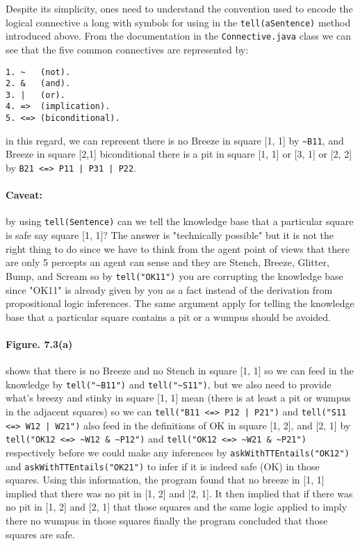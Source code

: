 \documentclass[a4paper]{report}
\begin{document}
Despite its simplicity, ones need to understand the convention used to encode the logical connective a long with symbols for using in the \texttt{tell(aSentence)} method introduced above. From the documentation in the \texttt{Connective.java} class we can see that the five common connectives are represented by: 

\begin{verbatim}
1. ~   (not).
2. &   (and).
3. |   (or).
4. =>  (implication).
5. <=> (biconditional).
\end{verbatim}

\noindent in this regard, we can represent there is no Breeze in square [1, 1] by \texttt{\textasciitilde{}B11}, and Breeze in square [2,1] biconditional there is a pit in square [1, 1] or [3, 1] or [2, 2] by \texttt{B21 <=> P11 | P31 | P22}.

\paragraph{Caveat: } by using \texttt{tell(Sentence)} can we tell the knowledge base that a particular square is safe say square [1, 1]? The answer is "technically possible" but it is not the right thing to do since we have to think from the agent point of views that there are only 5 percepts an agent can sense and they are Stench, Breeze, Glitter, Bump, and Scream so by \texttt{tell("OK11")} you are corrupting the knowledge base since "OK11" is already given by you as a fact instead of the derivation from propositional logic inferences. The same argument apply for telling the knowledge base that a particular square contains a pit or a wumpus should be avoided.\\

\paragraph{Figure. 7.3(a) } shows that there is no Breeze and no Stench in square [1, 1] so we can feed in the knowledge by \texttt{tell("\textasciitilde{}B11")} and \texttt{tell("\textasciitilde{}S11")}, but we also need to provide what's breezy and stinky in square [1, 1] mean (there is at least a pit or wumpus in the adjacent squares) so we can \texttt{tell("B11 <=> P12 | P21")} and \texttt{tell("S11 <=> W12 | W21")} also feed in the definitions of OK in square [1, 2], and [2, 1] by \texttt{tell("OK12 <=> \textasciitilde{}W12 \& \textasciitilde{}P12")} and \texttt{tell("OK12 <=> \textasciitilde{}W21 \& \textasciitilde{}P21")} respectively before we could make any inferences by \texttt{askWithTTEntails("OK12")} and \texttt{askWithTTEntails("OK21")} to infer if it is indeed safe (OK) in those squares. Using this information, the program found that no breeze in [1, 1] implied that there was no pit in [1, 2] and [2, 1]. It then implied that if there was no pit in [1, 2] and [2, 1] that those squares and the same logic applied to imply there no wumpus in those squares finally the program concluded that those squares are safe. \\
\end{document}
